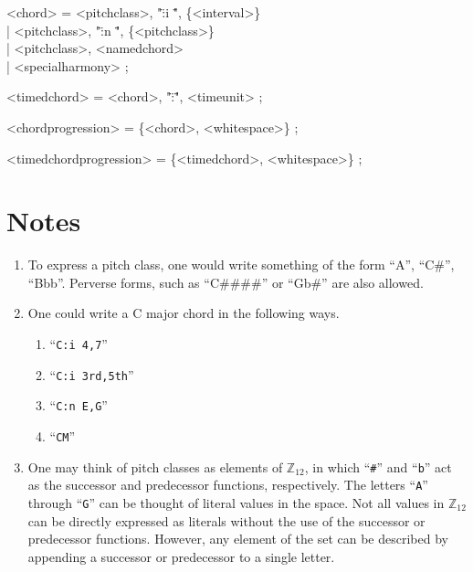 \documentclass{article}
\begin{document}
\begin{grammar}
<chord> = <pitchclass>, "\":i \"", \{<interval>\} \\
        | <pitchclass>, "\":n \"", \{<pitchclass>\} \\
        | <pitchclass>, <namedchord> \\
        | <specialharmony> ;

<timedchord> = <chord>, "\":\"", <timeunit> ;

<chordprogression> = \{<chord>, <whitespace>\} ;

<timedchordprogression> = \{<timedchord>, <whitespace>\} ;

\end{grammar}
\section{Notes}
\begin{enumerate}
\item To express a pitch class, one would write something of the form ``A'', ``C\#'', ``Bbb''. Perverse forms, such as ``C\#\#\#\#'' or ``Gb\#'' are also allowed.
\item One could write a C major chord in the following ways.
\begin{enumerate}
\item ``\texttt{C:i 4,7}''
\item ``\texttt{C:i 3rd,5th}''
\item ``\texttt{C:n E,G}''
\item ``\texttt{CM}''
\end{enumerate}



\item One may think of pitch classes as elements of $\mathbb{Z}_{12}$, in which ``\texttt{\#}'' and ``\texttt{b}'' act as the successor and predecessor functions, respectively. The letters ``\texttt{A}'' through ``\texttt{G}'' can be thought of literal values in the space. Not all values in $\mathbb{Z}_{12}$ can be directly expressed as literals without the use of the successor or predecessor functions. However, any element of the set can be described by appending a successor or predecessor to a single letter.
\end{enumerate}
\end{document}
